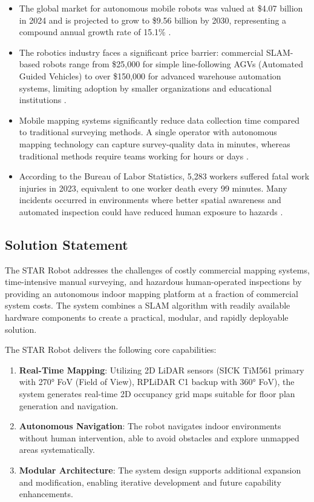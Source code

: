 \begin{itemize}
    \item The global market for autonomous mobile robots was valued at \$4.07 billion in 2024 and is projected to grow to \$9.56 billion by 2030, representing a compound annual growth rate of 15.1\% \parencite{grandview_amr_market}.
    \item The robotics industry faces a significant price barrier: commercial SLAM-based robots range from \$25,000 for simple line-following AGVs (Automated Guided Vehicles) to over \$150,000 for advanced warehouse automation systems, limiting adoption by smaller organizations and educational institutions \parencite{standardbots_robot_pricing}.
    \item Mobile mapping systems significantly reduce data collection time compared to traditional surveying methods. A single operator with autonomous mapping technology can capture survey-quality data in minutes, whereas traditional methods require teams working for hours or days \parencite{utilitiesone_mobile_mapping}.
    \item According to the Bureau of Labor Statistics, 5,283 workers suffered fatal work injuries in 2023, equivalent to one worker death every 99 minutes. Many incidents occurred in environments where better spatial awareness and automated inspection could have reduced human exposure to hazards \parencite{bls_cfoi_2021}.
\end{itemize}

\subsection{Solution Statement}

The STAR Robot addresses the challenges of costly commercial mapping systems, time-intensive manual surveying, and hazardous human-operated inspections by providing an autonomous indoor mapping platform at a fraction of commercial system costs. The system combines a SLAM algorithm with readily available hardware components to create a practical, modular, and rapidly deployable solution.

The STAR Robot delivers the following core capabilities:

\begin{enumerate}
    \item \textbf{Real-Time Mapping}: Utilizing 2D LiDAR sensors (SICK TiM561 primary with 270° FoV (Field of View), RPLiDAR C1 backup with 360° FoV), the system generates real-time 2D occupancy grid maps suitable for floor plan generation and navigation.
    \item \textbf{Autonomous Navigation}: The robot navigates indoor environments without human intervention, able to avoid obstacles and explore unmapped areas systematically. 
    \item \textbf{Modular Architecture}: The system design supports additional expansion and modification, enabling iterative development and future capability enhancements.
\end{enumerate}

